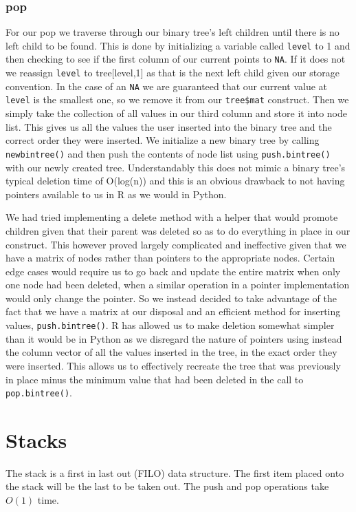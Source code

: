 \documentclass[11pt]{article}
\begin{document}
\subsubsection{pop}
For our pop we traverse through our binary tree's left children until there is no left child to be found. This is done by initializing a variable called {\tt level} to 1 and then checking to see if the first column of our current points to {\tt NA}. If it does not we reassign {\tt level} to tree[level,1] as that is the next left child given our storage convention. In the case of an {\tt NA} we are guaranteed that our current value at {\tt level} is the smallest one, so we remove it from our {\tt tree\$mat} construct. Then we simply take the collection of all values in our third column and store it into node list. This gives us all the values the user inserted into the binary tree and the correct order they were inserted. We initialize a new binary tree by calling {\tt newbintree()} and then push the contents of node list using {\tt push.bintree()} with our newly created tree. Understandably this does not mimic a binary tree's typical deletion time of O(log(n)) and this is an obvious drawback to not having pointers available to us in R as we would in Python. 

We had tried implementing a delete method with a helper that would promote children given that their parent was deleted so as to do everything in place in our construct. This however proved largely complicated and ineffective given that we have a matrix of nodes rather than pointers to the appropriate nodes. Certain edge cases would require us to go back and update the entire matrix when only one node had been deleted, when a similar operation in a pointer implementation would only change the pointer. So we instead decided to take advantage of the fact that we have a matrix at our disposal and an efficient method for inserting values, {\tt push.bintree()}. R has allowed us to make deletion somewhat simpler than it would be in Python as we disregard the nature of pointers using instead the column vector of all the values inserted in the tree, in the exact order they were inserted. This allows us to effectively recreate the tree that was previously in place minus the minimum value that had been deleted in the call to {\tt pop.bintree()}.


\section{Stacks} \label{stacks}
The stack is a first in last out (FILO) data structure. The first item placed onto the stack will be the last to be taken out. The push and pop operations take $O(1)$ time.
\end{document}
